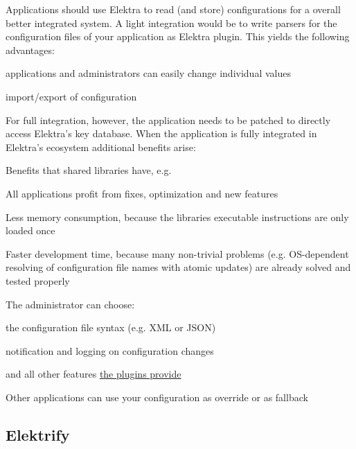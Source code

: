 Applications should use Elektra to read (and store) configurations for a overall better integrated system. A light integration would be to write parsers for the configuration files of your application as Elektra plugin. This yields the following advantages\+:


\begin{DoxyItemize}
\item applications and administrators can easily change individual values
\item import/export of configuration
\end{DoxyItemize}

For full integration, however, the application needs to be patched to directly access Elektra's key database. When the application is fully integrated in Elektra's ecosystem additional benefits arise\+:


\begin{DoxyItemize}
\item Benefits that shared libraries have, e.\+g.
\begin{DoxyItemize}
\item All applications profit from fixes, optimization and new features
\item Less memory consumption, because the libraries executable instructions are only loaded once
\item Faster development time, because many non-\/trivial problems (e.\+g. O\+S-\/dependent resolving of configuration file names with atomic updates) are already solved and tested properly
\end{DoxyItemize}
\item The administrator can choose\+:
\begin{DoxyItemize}
\item the configuration file syntax (e.\+g. X\+M\+L or J\+S\+O\+N)
\item notification and logging on configuration changes
\item and all other features \hyperlink{md_src_plugins_README_src_plugins_README_md}{the plugins provide}
\end{DoxyItemize}
\item Other applications can use your configuration as override or as fallback
\end{DoxyItemize}

\subsection*{Elektrify}

